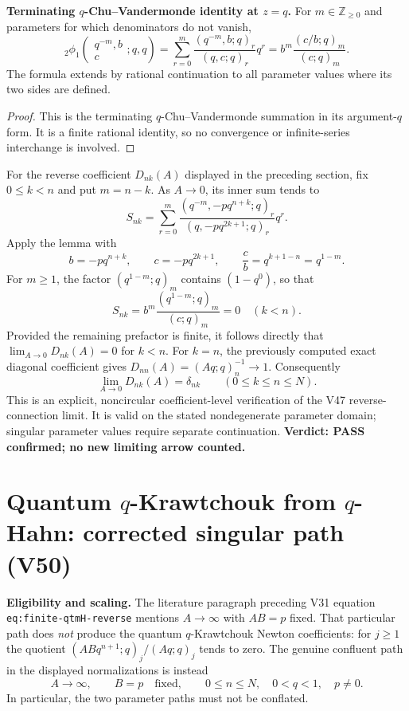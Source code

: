 \documentclass[11pt]{article}
\begin{document}
\noindent\textbf{Terminating $q$-Chu--Vandermonde identity at $z=q$.}
For $m\in\mathbb Z_{\geq0}$ and parameters for which denominators do not
vanish,
\[
{}_2\phi_1\!\left(\begin{matrix}q^{-m},b\\c\end{matrix};q,q\right)
=\sum_{r=0}^{m}\frac{(q^{-m},b;q)_r}{(q,c;q)_r}q^r
=b^m\frac{(c/b;q)_m}{(c;q)_m}.
\]
The formula extends by rational continuation to all parameter values
where its two sides are defined.

\begin{proof}
This is the terminating $q$-Chu--Vandermonde summation in its
argument-$q$ form. It is a finite rational identity, so no convergence
or infinite-series interchange is involved.
\end{proof}

For the reverse coefficient $D_{nk}(A)$ displayed in the preceding
section, fix $0\leq k<n$ and put $m=n-k$. As $A\to0$, its inner sum tends
to
\[
S_{nk}=\sum_{r=0}^{m}
\frac{(q^{-m},-pq^{n+k};q)_r}{(q,-pq^{2k+1};q)_r}q^r.
\]
Apply the lemma with
\[
b=-pq^{n+k},\qquad c=-pq^{2k+1},\qquad
\frac cb=q^{k+1-n}=q^{1-m}.
\]
For $m\geq1$, the factor $(q^{1-m};q)_m$ contains $(1-q^0)$,
so that
\[
\boxed{S_{nk}=b^m\frac{(q^{1-m};q)_m}{(c;q)_m}=0\quad(k<n).}
\]
Provided the remaining prefactor is finite, it follows directly that
$\lim_{A\to0}D_{nk}(A)=0$ for $k<n$. For $k=n$, the previously
computed exact diagonal coefficient gives
$D_{nn}(A)=(Aq;q)_n^{-1}\to1$. Consequently
\[
\boxed{\lim_{A\to0}D_{nk}(A)=\delta_{nk}\qquad(0\leq k\leq n\leq N).}
\]
This is an explicit, noncircular coefficient-level verification of the
V47 reverse-connection limit. It is valid on the stated nondegenerate
parameter domain; singular parameter values require separate
continuation. \textbf{Verdict: PASS confirmed; no new limiting arrow counted.}


\section{Quantum $q$-Krawtchouk from $q$-Hahn: corrected singular path (V50)}
\noindent\textbf{Eligibility and scaling.} The literature paragraph preceding
V31 equation \texttt{eq:finite-qtmH-reverse} mentions $A\to\infty$
with $AB=p$ fixed. That particular path does \emph{not} produce the
quantum $q$-Krawtchouk Newton coefficients: for $j\ge1$ the quotient
$(ABq^{n+1};q)_j/(Aq;q)_j$ tends to zero. The genuine confluent
path in the displayed normalizations is instead
\[
 A\longrightarrow\infty,\qquad B=p\quad\text{fixed},
 \qquad 0\le n\le N,\quad 0<q<1,\quad p\ne0.
\]
In particular, the two parameter paths must not be conflated.
\end{document}
